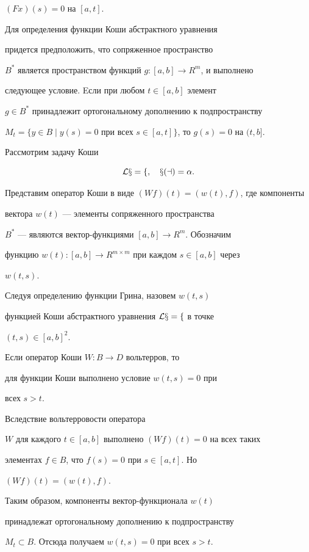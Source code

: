 $(F x)(s)=0$ на $[a,t]$. 


 


Для определения функции Коши абстрактного уравнения  


придется предположить, что сопряженное пространство 


$B^*$ является пространством функций $g:[a,b]\to R^m$, и выполнено  


следующее условие. Eсли при любом $t\in[a,b]$ элемент  


$g\in B^*$ принадлежит ортогональному дополнению к подпространству 


$M_t=\{y\in B\mid y(s)=0$ при всех $s\in[a,t]\}$, то $g(s)=0$ на $(t,b]$.  


 


Рассмотрим задачу Коши 


$$ 


\cal L x=f,\quad x(a)=\alpha. 


$$ 


Представим оператор Коши в виде $(W f)(t)=(w(t),f)$, где компоненты  


вектора $w(t)$ --- элементы сопряженного пространства  


$B^*$ --- являются вектор-функциями $[a,b]\to R^m$. Обозначим


функцию $w(t):[a,b]\to R^{m\times m}$ при каждом $s\in[a,b]$ через 


$w(t,s)$. 


Следуя определению функции Грина, назовем $w(t,s)$


функцией Коши абстрактного уравнения $\cal L x=f$ в точке  


$(t,s)\in[a,b]^2$. 


 


\begin{thm} 


Если оператор Коши $W:B\to D$ вольтерров, то  


для функции Коши выполнено условие $w(t,s)=0$ при  


всех $s>t$. 


\end{thm} 


 


\begin{pf} 


Вследствие вольтерровости оператора  


$W$ для каждого $t\in[a,b]$ выполнено $(W f)(t)=0$ на всех таких  


элементах $f\in B$, что $f(s)=0$ при $s\in[a,t]$. Но 


$(W f)(t)=(w(t),f)$. 


Таким образом, компоненты вектор-функционала $w(t)$  


принадлежат ортогональному дополнению к подпространству 


$M_t\subset B$. Отсюда получаем $w(t,s)=0$ при всех $s>t$. 


\end{pf} 


